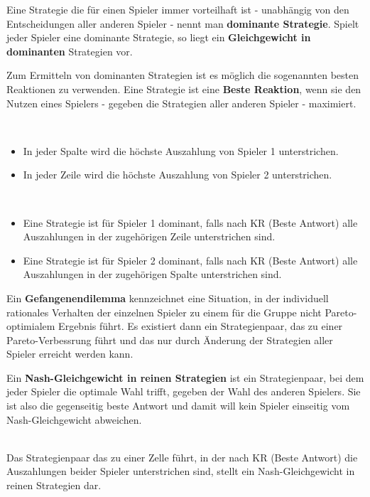 Eine Strategie die für einen Spieler immer vorteilhaft ist - unabhängig von den Entscheidungen aller anderen Spieler - nennt man \textbf{dominante Strategie}. Spielt jeder Spieler eine dominante Strategie, so liegt ein \textbf{Gleichgewicht in dominanten} Strategien vor. ~\smallskip

Zum Ermitteln von dominanten Strategien ist es möglich die sogenannten besten Reaktionen zu verwenden. Eine Strategie ist eine \textbf{Beste Reaktion}, wenn sie den Nutzen eines Spielers - gegeben die Strategien aller anderen Spieler - maximiert.

\begin{kr}~\
	\begin{itemize} 		
		\item In jeder Spalte wird die höchste Auszahlung von Spieler 1 unterstrichen. 
		\item In jeder Zeile wird die höchste Auszahlung von Spieler 2 unterstrichen.
	\end{itemize}	
\end{kr}

\begin{kr} ~\
	\begin{itemize}
		\item Eine Strategie ist für Spieler 1 dominant, falls nach KR (Beste Antwort) alle Auszahlungen in der zugehörigen Zeile unterstrichen sind.
		\item Eine Strategie ist für Spieler 2 dominant, falls nach KR (Beste Antwort) alle Auszahlungen in der zugehörigen Spalte unterstrichen sind.
	\end{itemize}	
\end{kr}

Ein \textbf{Gefangenendilemma} kennzeichnet eine Situation, in der individuell rationales Verhalten der einzelnen Spieler zu einem für die Gruppe nicht Pareto-optimialem Ergebnis führt. Es existiert dann ein Strategienpaar, das zu einer Pareto-Verbessrung führt und das nur durch Änderung der Strategien aller Spieler erreicht werden kann. ~\bigskip

Ein \textbf{Nash-Gleichgewicht in reinen Strategien} ist ein Strategienpaar, bei dem jeder Spieler die optimale Wahl trifft, gegeben der Wahl des anderen Spielers. Sie ist also die gegenseitig beste Antwort und damit will kein Spieler einseitig vom  Nash-Gleichgewicht abweichen.

\begin{kr}[Nash-Gleichgewicht in reinen Strategien] ~\\
	Das Strategienpaar das zu einer Zelle führt, in der nach KR (Beste Antwort) die Auszahlungen beider Spieler unterstrichen sind, stellt ein Nash-Gleichgewicht in reinen Strategien dar.
\end{kr}

